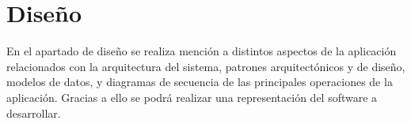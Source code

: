 \chapter{Diseño}

En el apartado de diseño se realiza mención a distintos aspectos de la aplicación relacionados con la arquitectura del sistema, patrones arquitectónicos y de diseño, modelos de datos, y diagramas de secuencia de las principales operaciones de la aplicación. Gracias a ello se podrá realizar una representación del software a desarrollar.





